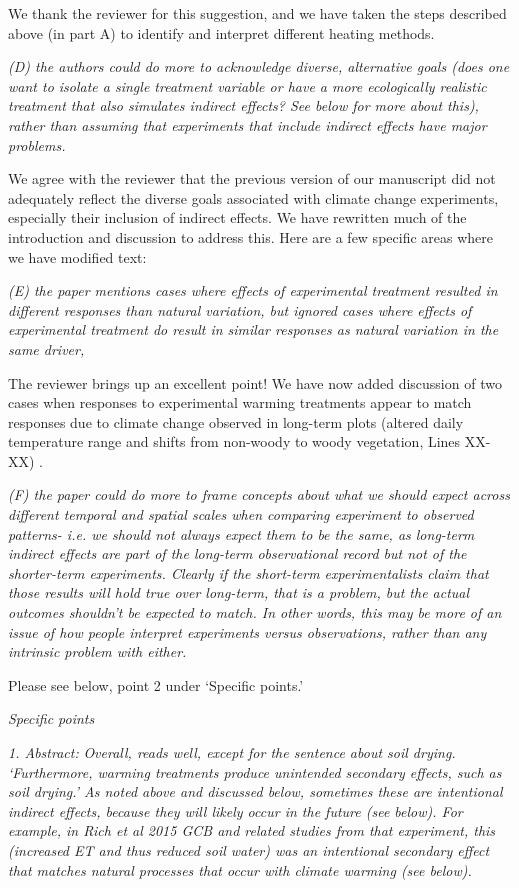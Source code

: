 \documentclass[11pt,a4paper]{letter}
\begin{document}
We thank the reviewer for this suggestion, and we have taken the steps described above (in part A) to identify and interpret different heating methods.

\emph{(D) the authors could do more to acknowledge diverse, alternative goals (does one want to isolate a single treatment variable or have a more ecologically realistic treatment that also simulates indirect effects? See below for more about this), rather than assuming that experiments that include indirect effects have major problems.}

We agree with the reviewer that the previous version of our manuscript did not adequately reflect the diverse goals associated with climate change experiments, especially their inclusion of indirect effects. We have rewritten much of the introduction and discussion to address this. Here are a few specific areas where we have modified text:


\emph{(E) the paper mentions cases where effects of experimental treatment resulted in different responses than natural variation, but ignored cases where effects of experimental treatment do result in similar responses as natural variation in the same driver,}

The reviewer brings up an excellent point! We have now added discussion of two cases when responses to experimental warming treatments appear to match responses due to climate change observed in long-term plots (altered daily temperature range and shifts from non-woody to woody vegetation, Lines XX-XX) . 

\emph{(F) the paper could do more to frame concepts about what we should expect across different temporal and spatial scales when comparing experiment to observed patterns- i.e. we should not always expect them to be the same, as long-term indirect effects are part of the long-term observational record but not of the shorter-term experiments. Clearly if the short-term experimentalists claim that those results will hold true over long-term, that is a problem, but the actual outcomes shouldn't be expected to match. In other words, this may be more of an issue of how people interpret experiments versus observations, rather than any intrinsic problem with either.}

\par Please see below, point 2 under `Specific points.'

\emph{Specific points}
\par \emph{1. Abstract:}
\emph{Overall, reads well, except for the sentence about soil drying. `Furthermore, warming treatments produce unintended secondary effects, such as soil drying.' As noted above and discussed below, sometimes these are intentional indirect effects, because they will likely occur in the future (see below). For example, in Rich et al 2015 GCB and related studies from that experiment, this (increased ET and thus reduced soil water) was an intentional secondary effect that matches natural processes that occur with climate warming (see below).}
\end{document}

